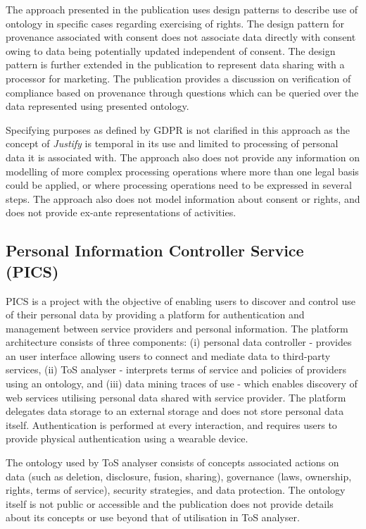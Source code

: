 The approach presented in the publication uses design patterns to describe use of ontology in specific cases regarding exercising of rights. The design pattern for provenance associated with consent does not associate data directly with consent owing to data being potentially updated independent of consent. The design pattern is further extended in the publication to represent data sharing with a processor for marketing. The publication provides a discussion on verification of compliance based on provenance through questions which can be queried over the data represented using presented ontology.

Specifying purposes as defined by GDPR is not clarified in this approach as the concept of \textit{Justify} is temporal in its use and limited to processing of personal data it is associated with. The approach also does not provide any information on modelling of more complex processing operations where more than one legal basis could be applied, or where processing operations need to be expressed in several steps. The approach also does not model information about consent or rights, and does not provide ex-ante representations of activities.

\subsection*{Personal Information Controller Service (PICS)}
PICS is a project with the objective of enabling users to discover and control use of their personal data by providing a platform for authentication and management between service providers and personal information. The platform architecture \cite{winckler_personal_2019} consists of three components: (i) personal data controller - provides an user interface allowing users to connect and mediate data to third-party services, (ii) ToS analyser - interprets terms of service and policies of providers using an ontology, and (iii) data mining traces of use - which enables discovery of web services utilising personal data shared with service provider. The platform delegates data storage to an external storage and does not store personal data itself. Authentication is performed at every interaction, and requires users to provide physical authentication using a wearable device.

The ontology used by ToS analyser \cite{benfenatki_towards_2018} consists of concepts associated actions on data (such as deletion, disclosure, fusion, sharing), governance (laws, ownership, rights, terms of service), security strategies, and data protection. The ontology itself is not public or accessible and the publication does not provide details about its concepts or use beyond that of utilisation in ToS analyser.

